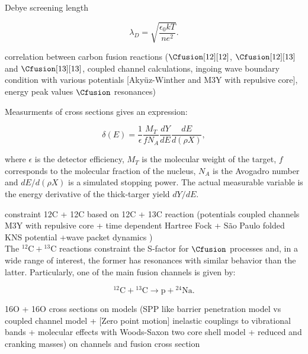 \documentclass[openany]{book}
\begin{document}
Debye screening length

\begin{equation}\label{eq:middleFusion_screening_debayWavelegth}
	\lambda_D = \sqrt{\frac{\epsilon_0kT}{ne^2}}.
\end{equation}

correlation between carbon fusion reactions ($\Cfusion[12][12]$, $\Cfusion[12][13]$ and  $\Cfusion[13][13]$, coupled channel calculations, ingoing wave boundary condition with various potentials [Akyüz-Winther and M3Y with repulsive core], energy peak values $\Cfusion$ resonances) \cite{notani_esbensen_fang_bucher_davies_jiang_lamm_lin_ma_martin_et_2012}

Measurments of cross sections gives an expression:

\begin{equation}\label{eq:middleFusion_experimental_crossSection}
	\delta (E) = \frac{1}{\epsilon} \frac{M_T}{fN_A} \frac{dY}{dE} \frac{dE}{d(\rho X)}, 
\end{equation}

where $\epsilon$ is the detector efficiency, $M_T$ is the molecular weight of the target, $f$ corresponds to the molecular fraction of the nucleus, $N_A$ is the Avogadro number and $dE/d(\rho X)$ is a simulated stopping power. The actual measurable variable is the energy derivative of the thick-targer yield $dY/dE$.

constraint 12C + 12C based on 12C + 13C reaction (potentials coupled channels M3Y with repulsive core + time dependent Hartree Fock + São Paulo folded KNS potential +wave packet dynamics ) \cite{zhang_wang_tudor_bucher_burducea_chen_chen_chesneanu_chilug_gasques_et_2020} \\

The $\mathrm{{}^{12}C + {}^{13}C}$ reactions constraint the S-factor for $\Cfusion$ processes and, in a wide range of interest, the former has resonances with similar behavior than the latter. Particularly, one of the main fusion channels is given by: 

\begin{equation}\label{eq:middleFusion_12C13C}
	\mathrm{{}^{12}C + {}^{13}C \rightarrow p + {}^{24}Na}.
\end{equation} 


16O + 16O cross sections on models (SPP like barrier penetration model vs coupled channel model + [Zero point motion] inelastic couplings to vibrational bands + molecular effects with Woods-Saxon two core shell model + reduced and cranking masses) on channels and fusion cross section  \cite{duarte_gasques_oliveira_zagatto_chamon_medina_added_seale_alcantara-nunez_rossi_et_2015} 
\end{document}

